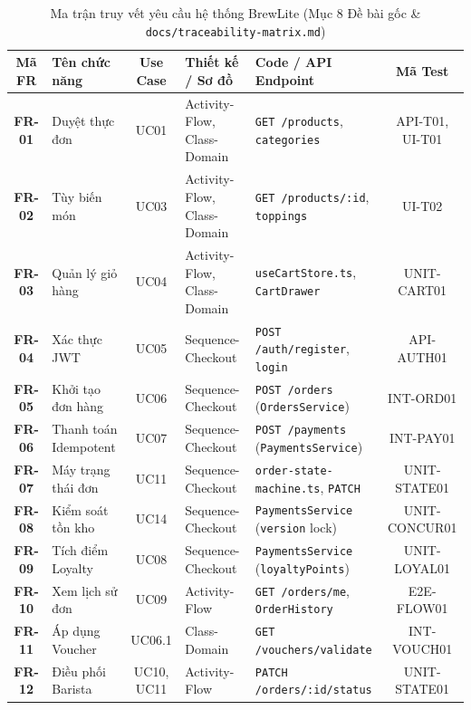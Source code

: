 \documentclass[a4paper,12pt]{article}
\begin{document}
\begin{table}[h!]
\centering
\scriptsize
\begin{tabularx}{\textwidth}{|c|l|c|X|X|c|}
\hline
\textbf{Mã FR} & \textbf{Tên chức năng} & \textbf{Use Case} & \textbf{Thiết kế / Sơ đồ} & \textbf{Code / API Endpoint} & \textbf{Mã Test} \\
\hline
\textbf{FR-01} & Duyệt thực đơn & UC01 & Activity-Flow, Class-Domain & \texttt{GET /products}, \texttt{categories} & API-T01, UI-T01 \\
\hline
\textbf{FR-02} & Tùy biến món & UC03 & Activity-Flow, Class-Domain & \texttt{GET /products/:id}, \texttt{toppings} & UI-T02 \\
\hline
\textbf{FR-03} & Quản lý giỏ hàng & UC04 & Activity-Flow, Class-Domain & \texttt{useCartStore.ts}, \texttt{CartDrawer} & UNIT-CART01 \\
\hline
\textbf{FR-04} & Xác thực JWT & UC05 & Sequence-Checkout & \texttt{POST /auth/register}, \texttt{login} & API-AUTH01 \\
\hline
\textbf{FR-05} & Khởi tạo đơn hàng & UC06 & Sequence-Checkout & \texttt{POST /orders} (\texttt{OrdersService}) & INT-ORD01 \\
\hline
\textbf{FR-06} & Thanh toán Idempotent & UC07 & Sequence-Checkout & \texttt{POST /payments} (\texttt{PaymentsService}) & INT-PAY01 \\
\hline
\textbf{FR-07} & Máy trạng thái đơn & UC11 & Sequence-Checkout & \texttt{order-state-machine.ts}, \texttt{PATCH} & UNIT-STATE01 \\
\hline
\textbf{FR-08} & Kiểm soát tồn kho & UC14 & Sequence-Checkout & \texttt{PaymentsService} (\texttt{version} lock) & UNIT-CONCUR01 \\
\hline
\textbf{FR-09} & Tích điểm Loyalty & UC08 & Sequence-Checkout & \texttt{PaymentsService} (\texttt{loyaltyPoints}) & UNIT-LOYAL01 \\
\hline
\textbf{FR-10} & Xem lịch sử đơn & UC09 & Activity-Flow & \texttt{GET /orders/me}, \texttt{OrderHistory} & E2E-FLOW01 \\
\hline
\textbf{FR-11} & Áp dụng Voucher & UC06.1 & Class-Domain & \texttt{GET /vouchers/validate} & INT-VOUCH01 \\
\hline
\textbf{FR-12} & Điều phối Barista & UC10, UC11 & Activity-Flow & \texttt{PATCH /orders/:id/status} & UNIT-STATE01 \\
\hline
\end{tabularx}
\caption{Ma trận truy vết yêu cầu hệ thống BrewLite (Mục 8 Đề bài gốc \& \texttt{docs/traceability-matrix.md})}
\end{table}
\end{document}
